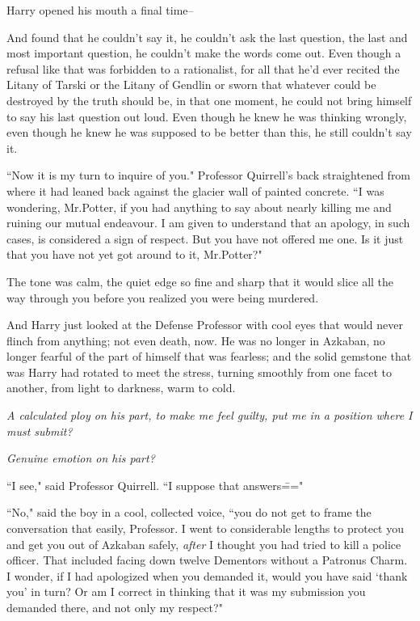 Harry opened his mouth a final time\---

And found that he couldn't say it, he couldn't ask the last question, the last and most important question, he couldn't make the words come out. Even though a refusal like that was forbidden to a rationalist, for all that he'd ever recited the Litany of Tarski or the Litany of Gendlin or sworn that whatever could be destroyed by the truth should be, in that one moment, he could not bring himself to say his last question out loud. Even though he knew he was thinking wrongly, even though he knew he was supposed to be better than this, he still couldn't say it.

``Now it is my turn to inquire of you." Professor Quirrell's back straightened from where it had leaned back against the glacier wall of painted concrete. ``I was wondering, Mr.\?Potter, if you had anything to say about nearly killing me and ruining our mutual endeavour. I am given to understand that an apology, in such cases, is considered a sign of respect. But you have not offered me one. Is it just that you have not yet got around to it, Mr.\?Potter?"

The tone was calm, the quiet edge so fine and sharp that it would slice all the way through you before you realized you were being murdered.

And Harry just looked at the Defense Professor with cool eyes that would never flinch from anything; not even death, now. He was no longer in Azkaban, no longer fearful of the part of himself that was fearless; and the solid gemstone that was Harry had rotated to meet the stress, turning smoothly from one facet to another, from light to darkness, warm to cold.

\emph{A calculated ploy on his part, to make me feel guilty, put me in a position where I must submit?}

\emph{Genuine emotion on his part?}

``I see," said Professor Quirrell. ``I suppose that answers\==="

``No," said the boy in a cool, collected voice, ``you do not get to frame the conversation that easily, Professor. I went to considerable lengths to protect you and get you out of Azkaban safely, \emph{after} I thought you had tried to kill a police officer. That included facing down twelve Dementors without a Patronus Charm. I wonder, if I had apologized when you demanded it, would you have said `thank you' in turn? Or am I correct in thinking that it was my submission you demanded there, and not only my respect?"

